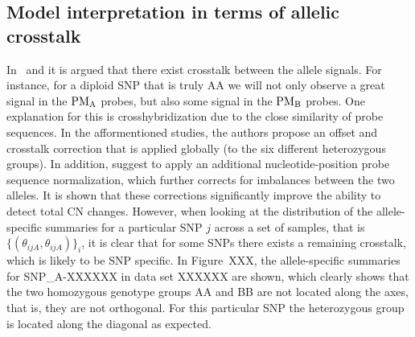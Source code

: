 \documentclass[10pt]{bmc_article}
\newenvironment{bmcformat}{\fussy\setboolean{publ}{true}}{\fussy}
\newcommand{\PMA}{\ensuremath{\textnormal{PM}_\textnormal{A}}\xspace}
\newcommand{\PMB}{\ensuremath{\textnormal{PM}_\textnormal{B}}\xspace}
\begin{document}
\begin{bmcformat}
\subsection*{Model interpretation in terms of allelic crosstalk}
\label{secACCModel}
In~\cite{BengtssonH_etal_2008} and \cite{BengtssonH_etal_2009b} it is argued that there exist crosstalk between the allele signals.  For instance, for a diploid SNP that is truly AA we will not only observe a great signal in the \PMA probes, but also some signal in the \PMB probes.  One explanation for this is crosshybridization due to the close similarity of probe sequences.  In the afformentioned studies, the authors propose an offset and crosstalk correction that is applied globally (to the six different heterozygous groups).  In addition, \cite{BengtssonH_etal_2009b} suggest to apply an additional nucleotide-position probe sequence normalization, which further corrects for imbalances between the two alleles.  It is shown that these corrections significantly improve the ability to detect total CN changes.
However, when looking at the distribution of the allele-specific summaries for a particular SNP $j$ across a set of samples, that is $\{(\theta_{ijA},\theta_{ijA})\}_i$, it is clear that for some SNPs there exists a remaining crosstalk, which is likely to be SNP specific.  In Figure~XXX, the allele-specific summaries for SNP\_A-XXXXXX in data set XXXXXX are shown, which clearly shows that the two homozygous genotype groups AA and BB are not located along the axes, that is, they are not orthogonal. For this particular SNP the heterozygous group is located along the diagonal as expected.


\end{bmcformat}
\end{document}
